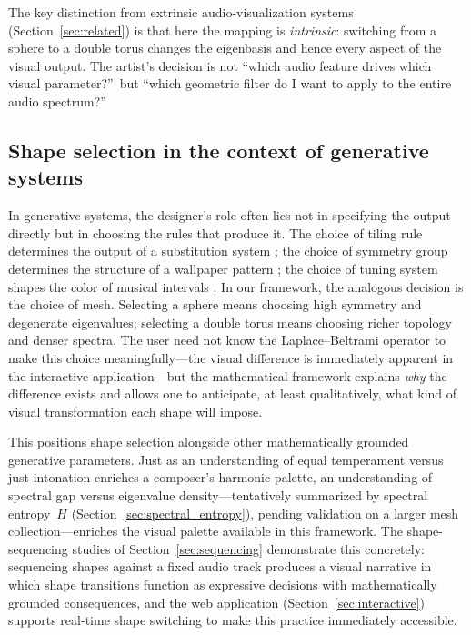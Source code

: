 \documentclass[]{interact}
\theoremstyle{plain}
\theoremstyle{definition}
\theoremstyle{remark}
\begin{document}
The key distinction from extrinsic audio-visualization systems (Section~\ref{sec:related}) is that here the mapping is \emph{intrinsic}: switching from a sphere to a double torus changes the eigenbasis and hence every aspect of the visual output. The artist's decision is not ``which audio feature drives which visual parameter?''\ but ``which geometric filter do I want to apply to the entire audio spectrum?''

\subsection{Shape selection in the context of generative systems}

In generative systems, the designer's role often lies not in specifying the output directly but in choosing the rules that produce it. The choice of tiling rule determines the output of a substitution system \citep{trevio2022}; the choice of symmetry group determines the structure of a wallpaper pattern \citep{goldstine2017}; the choice of tuning system shapes the color of musical intervals \citep{sethares1998}. In our framework, the analogous decision is the choice of mesh. Selecting a sphere means choosing high symmetry and degenerate eigenvalues; selecting a double torus means choosing richer topology and denser spectra. The user need not know the Laplace--Beltrami operator to make this choice meaningfully---the visual difference is immediately apparent in the interactive application---but the mathematical framework explains \emph{why} the difference exists and allows one to anticipate, at least qualitatively, what kind of visual transformation each shape will impose.

This positions shape selection alongside other mathematically grounded generative parameters. Just as an understanding of equal temperament versus just intonation enriches a composer's harmonic palette, an understanding of spectral gap versus eigenvalue density---tentatively summarized by spectral entropy~$H$ (Section~\ref{sec:spectral_entropy}), pending validation on a larger mesh collection---enriches the visual palette available in this framework. The shape-sequencing studies of Section~\ref{sec:sequencing} demonstrate this concretely: sequencing shapes against a fixed audio track produces a visual narrative in which shape transitions function as expressive decisions with mathematically grounded consequences, and the web application (Section~\ref{sec:interactive}) supports real-time shape switching to make this practice immediately accessible.
\end{document}
